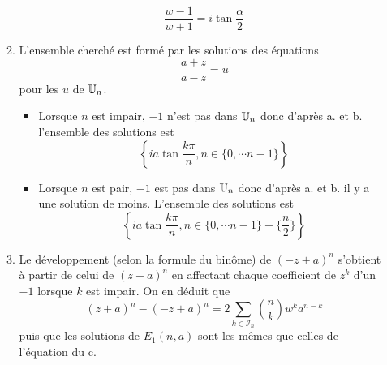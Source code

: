 \begin{enumerate}
\begin{enumerate}
\begin{displaymath}
 \frac{w-1}{w+1} = i\tan \frac{\alpha}{2}
\end{displaymath}
\item L'ensemble cherché est formé par les solutions des équations 
\begin{displaymath}
 \frac{a+z}{a-z} = u
\end{displaymath}
pour les $u$ de $\mathbb{U}_n$.
\begin{itemize}
 \item Lorsque $n$ est impair, $-1$ n'est pas dans $\mathbb{U}_n$ donc d'après a. et b. l'ensemble des solutions est
\begin{displaymath}
 \left\lbrace ia \tan \frac{k\pi}{n}, n\in \{0,\cdots n-1\}\right\rbrace 
\end{displaymath}
\item  Lorsque $n$ est pair, $-1$ est pas dans $\mathbb{U}_n$ donc d'après a. et b. il y a une solution de moins. L'ensemble des solutions est
\begin{displaymath}
 \left\lbrace ia \tan \frac{k\pi}{n}, n\in \{0,\cdots n-1\}-\{\frac{n}{2}\}\right\rbrace 
\end{displaymath}
\end{itemize}
\item Le développement (selon la formule du binôme) de $(-z+a)^n$ s'obtient à partir de celui de $(z+a)^n$ en affectant chaque coefficient de $z^k$ d'un $-1$ lorsque $k$ est impair. On en déduit que
\begin{displaymath}
 (z+a)^n - (-z+a)^n = 2 \sum_{k\in \mathcal I _n}\binom{n}{k}w^k a^{n-k}
\end{displaymath}
puis que les solutions de $E_1(n,a)$ sont les mêmes que celles de l'équation du c.

\end{enumerate}


\end{enumerate}
